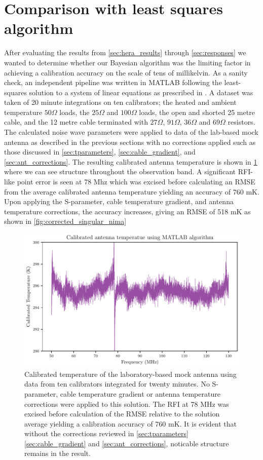 \section{Comparison with least squares algorithm}\label{sec:matlab_results}
After evaluating the results from \cref{sec:hera_results} through \cref{sec:responses} we wanted to determine whether our Bayesian algorithm was the limiting factor in achieving a calibration accuracy on the scale of tens of millikelvin. As a sanity check, an independent pipeline was written in MATLAB following the least-squares solution to a system of linear equations as prescribed in \citet{edgesCal}. A dataset was taken of 20 minute integrations on ten calibrators; the heated and ambient temperature $50 \Omega$ loads, the $25 \Omega$ and $100 \Omega$ loads, the open and shorted 25 metre cable, and the 12 metre cable terminated with $27 \Omega$, $91 \Omega$, $36 \Omega$ and $69 \Omega$ resistors. The calculated noise wave parameters were applied to data of the lab-based mock antenna as described in the previous sections with no corrections applied such as those discussed in \cref{sec:tparameters}, \cref{sec:cable_gradient}, and \cref{sec:ant_corrections}. The resulting calibrated antenna temperature is shown in \cref{fig:raw_singular_nima} where we can see structure throughout the observation band. A significant RFI-like point error is seen at 78 Mhz which was excised before calculating an RMSE from the average calibrated antenna temperature yielding an accuracy of 760 mK. Upon applying the S-parameter, cable temperature gradient, and antenna temperature corrections, the accuracy increases, giving an RMSE of 518 mK as shown in \cref{fig:corrected_singular_nima}
\begin{figure}
    \centering
    \includegraphics[width=.8\textwidth]{raw_matlab_solution}
    \caption{Calibrated temperature of the laboratory-based mock antenna using data from ten calibrators integrated for twenty minutes. No S-parameter, cable temperature gradient or antenna temperature corrections were applied to this solution. The RFI at 78 MHz was excised before calculation of the RMSE relative to the solution average yielding a calibration accuracy of 760 mK. It is evident that without the corrections reviewed in \cref{sec:tparameters} \cref{sec:cable_gradient} and \cref{sec:ant_corrections}, noticable structure remains in the result.}
    \label{fig:raw_singular_nima}
\end{figure}
